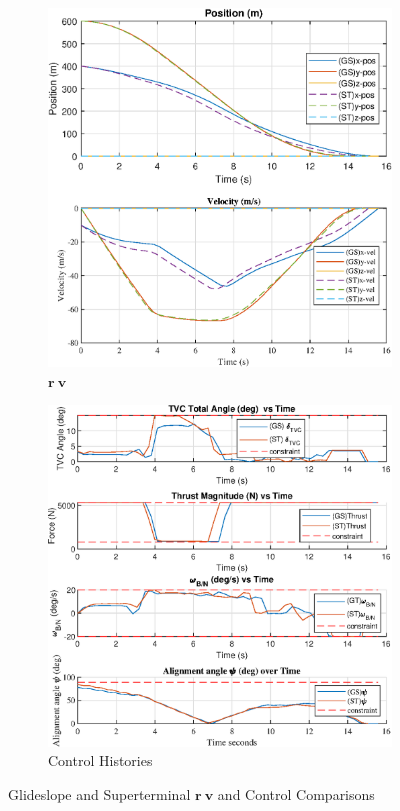 \begin{figure}[htpb!]
\begin{subfigure}{.5\textwidth}
  \centering
  \includegraphics[width=1\linewidth]{figs/ST_rv.eps}
  \caption{$\mathbf{r} \ \mathbf{v}$}
  \label{fig:ST_rv}
\end{subfigure}%
\begin{subfigure}{.5\textwidth}
  \centering
  \includegraphics[width=1\linewidth]{figs/ST_controls.eps}
  \caption{Control Histories}
  \label{fig:ST_controls}
\end{subfigure}
\caption{Glideslope and Superterminal $\mathbf{r} \ \mathbf{v}$ and Control Comparisons}
\label{fig:STrvc}
\end{figure}



